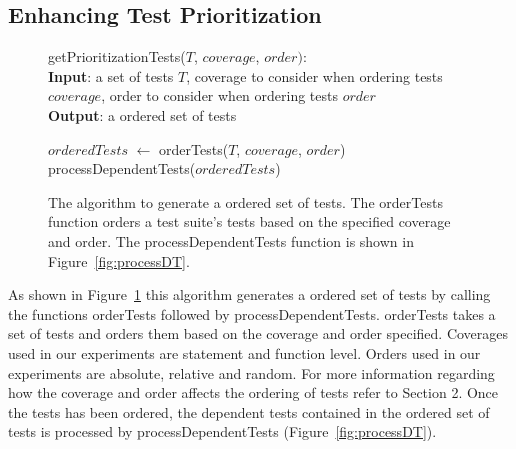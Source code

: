 \subsection{Enhancing Test Prioritization}
\begin{figure}[t]
	getPrioritizationTests($\mathit{T}$, $\mathit{coverage}$, $\mathit{order}):$\\
	\textbf{Input}: a set of tests $\mathit{T}$, coverage to consider when ordering
	tests $\mathit{coverage}$, order to consider when ordering tests $\mathit{order}$\\
	\textbf{Output}: a ordered set of tests\\
	 \begin{algorithmic}[1]
	 	\vspace{-5mm}
		\STATE $\mathit{orderedTests}$ $\leftarrow$ orderTests($\mathit{T}$,
		$\mathit{coverage}$, $\mathit{order}$)
		\RETURN processDependentTests($\mathit{orderedTests}$)
	\end{algorithmic}
	\vspace{-3mm}
	\caption {
		The algorithm to generate a ordered set of tests. The orderTests function orders
		a test suite's tests based on the specified coverage and order. The
		processDependentTests function is shown in Figure~\ref{fig:processDT}.
	}
	\label{fig:prioritization}
\end{figure}
As shown in Figure~\ref{fig:prioritization} this algorithm generates a ordered
set of tests by calling the functions orderTests followed by
processDependentTests. orderTests takes a set of tests and orders them based on
the coverage and order specified. Coverages used in our experiments are statement
and function level. Orders used in our experiments are absolute, relative and
random. For more information regarding how the coverage and order affects the
ordering of tests refer to Section 2. Once the tests has been ordered, the dependent
tests contained in the ordered set of tests is processed by processDependentTests
(Figure~\ref{fig:processDT}).

